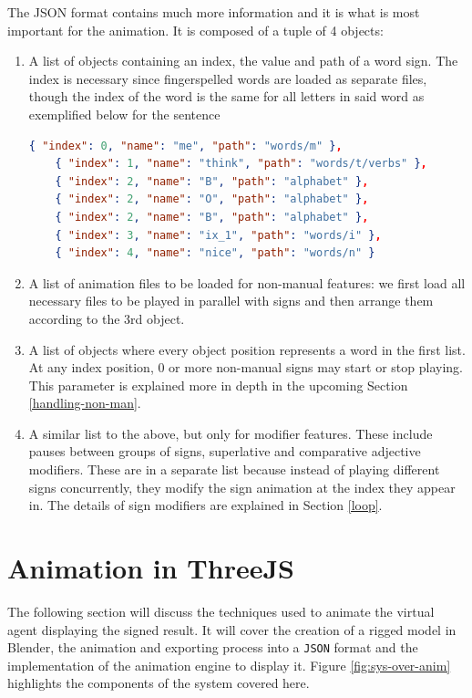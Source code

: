 \documentclass[12pt]{ociamthesis}  %
\begin{document}
The JSON format contains much more information and it is what is most important for the animation. It is composed of a tuple of 4 objects:
\begin{enumerate}
	\item A list of objects containing an index, the value and path of a word sign. The index is necessary since fingerspelled words are loaded as separate files, though the index of the word is the same for all letters in said word as exemplified below for the sentence 
	\begin{lstlisting}[language=json]
	{ "index": 0, "name": "me", "path": "words/m" }, 
	{ "index": 1, "name": "think", "path": "words/t/verbs" },
	{ "index": 2, "name": "B", "path": "alphabet" }, 
	{ "index": 2, "name": "O", "path": "alphabet" }, 
	{ "index": 2, "name": "B", "path": "alphabet" }, 
	{ "index": 3, "name": "ix_1", "path": "words/i" }, 
	{ "index": 4, "name": "nice", "path": "words/n" }
	\end{lstlisting}
	\item A list of animation files to be loaded for non-manual features: we first load all necessary files to be played in parallel with signs and then arrange them according to the 3rd object.
	\item A list of objects where every object position represents a word in the first list. At any index position, 0 or more non-manual signs may start or stop playing. This parameter is explained more in depth in the upcoming Section \ref{handling-non-man}.
	\item A similar list to the above, but only for modifier features. These include pauses between groups of signs, superlative and comparative adjective modifiers. These are in a separate list because instead of playing different signs concurrently, they modify the sign animation at the index they appear in. The details of sign modifiers are explained in Section \ref{loop}.
\end{enumerate}

\newpage
\section{Animation in ThreeJS}
The following section will discuss the techniques used to animate the virtual agent displaying the signed result. It will cover the creation of a rigged model in Blender, the animation and exporting process into a \texttt{JSON} format and the implementation of the animation engine to display it. Figure \ref{fig:sys-over-anim} highlights the components of the system covered here.
\end{document}
